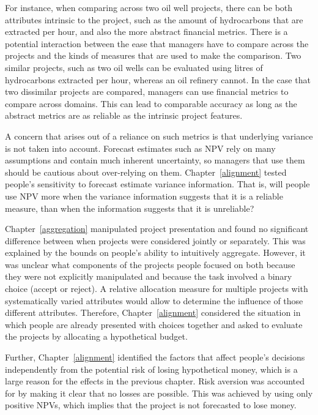 \documentclass[a4paper, nobind, dvipsnames]{templates/ociamthesis}
\theoremstyle{definition}
\theoremstyle{definition}
\theoremstyle{definition}
\theoremstyle{definition}
\theoremstyle{remark}
\begin{document}
For instance, when comparing across two oil well projects, there can be both
attributes intrinsic to the project, such as the amount of hydrocarbons that are
extracted per hour, and also the more abstract financial metrics. There is a
potential interaction between the ease that managers have to compare across the
projects and the kinds of measures that are used to make the comparison. Two
similar projects, such as two oil wells can be evaluated using litres of
hydrocarbons extracted per hour, whereas an oil refinery cannot. In the case
that two dissimilar projects are compared, managers can use financial metrics to
compare across domains. This can lead to comparable accuracy as long as the
abstract metrics are as reliable as the intrinsic project features.

A concern that arises out of a reliance on such metrics is that underlying
variance is not taken into account. Forecast estimates such as NPV rely on many
assumptions and contain much inherent uncertainty, so managers that use them
should be cautious about over-relying on them. Chapter~\ref{alignment} tested
people's sensitivity to forecast estimate variance information. That is, will
people use NPV more when the variance information suggests that it is a reliable
measure, than when the information suggests that it is unreliable?

Chapter~\ref{aggregation} manipulated project presentation and found no
significant difference between when projects were considered jointly or
separately. This was explained by the bounds on people's ability to intuitively
aggregate. However, it was unclear what components of the projects people
focused on both because they were not explicitly manipulated and because the
task involved a binary choice (accept or reject). A relative allocation measure
for multiple projects with systematically varied attributes would allow to
determine the influence of those different attributes. Therefore,
Chapter~\ref{alignment} considered the situation in which people are already
presented with choices together and asked to evaluate the projects by allocating
a hypothetical budget.

Further, Chapter~\ref{alignment} identified the factors that affect people's
decisions independently from the potential risk of losing hypothetical money,
which is a large reason for the effects in the previous chapter. Risk aversion
was accounted for by making it clear that no losses are possible. This was
achieved by using only positive NPVs, which implies that the project is not
forecasted to lose money.
\end{document}
